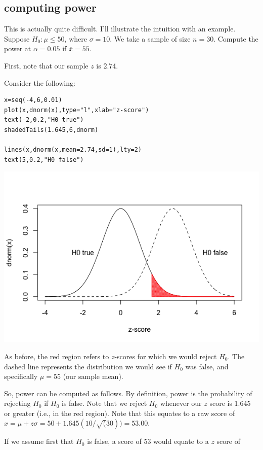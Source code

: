 \documentclass[11pt]{article}
\begin{document}
\subsection*{computing power}
\label{sec-3-1}

This is actually quite difficult.  I'll illustrate the intuition with an example.  Suppose $H_0: \mu\leq 50$, where $\sigma=10$.  We take a sample of size $n=30$.  Compute the power at $\alpha=0.05$ if $\overline{x}=55$.

First, note that our sample $z$ is 2.74.

Consider the following:

\begin{verbatim}
x=seq(-4,6,0.01)
plot(x,dnorm(x),type="l",xlab="z-score")
text(-2,0.2,"H0 true")
shadedTails(1.645,6,dnorm)

lines(x,dnorm(x,mean=2.74,sd=1),lty=2)
text(5,0.2,"H0 false")
\end{verbatim}

\includegraphics[width=.9\linewidth]{figures/week4/power1.png}

As before, the red region refers to $z$-scores for which we would reject $H_0$.  The dashed line represents the distribution we would see if $H_0$ was false, and specifically $\mu=55$ (our sample mean).  

So, power can be computed as follows.  By definition, power is the probability of rejecting $H_0$ if $H_0$ is false.  Note that we reject $H_0$ whenever our $z$ score is 1.645 or greater (i.e., in the red region).   Note that this equates to a raw score of $x=\mu+z\sigma = 50+1.645(10/\sqrt(30))=53.00$.  

If we assume first that $H_0$ is false, a score of 53 would equate to a $z$ score of 
\end{document}
